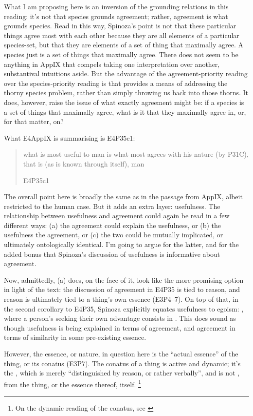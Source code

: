 \documentclass{article}
\newcommand\foreign[2]{\foreignlanguage{#1}{\emph{#2}}}
\begin{document}
What I am proposing here is an inversion of the grounding relations in this reading: it's not that species grounds agreement; rather, agreement is what grounds species. Read in this way, Spinoza's point is not that these particular things agree most with each other because they are all elements of a particular species-set, but that they are elements of a set of thing that maximally agree. A species just is a set of things that maximally agree. There does not seem to be anything in App\RN{9} that compels taking one interpretation over another, substantival intuitions aside. But the advantage of the agreement-priority reading over the species-priority reading is that provides a means of addressing the thorny species problem, rather than simply throwing us back into those thorns. It does, however, raise the issue of what exactly agreement might be: if a species is a set of things that maximally agree, what is it that they maximally agree in, or, for that matter, on?

What E4App\RN{9} is summarising is E4P35c1: \blockquote[E4P35c1]{what is most useful to man is what most agrees \textins{\foreign{latin}{convenit}} with his nature (by P31C), that is (as is known through itself), man}. The overall point here is broadly the same as in the passage from App\RN{9}, albeit restricted to the human case. But it adds an extra layer: usefulness. The relationship between usefulness and agreement could again be read in a few different ways: (a) the agreement could explain the usefulness, or (b) the usefulness the agreement, or (c) the two could be mutually implicated, or ultimately ontologically identical. I'm going to argue for the latter, and for the added bonus that Spinoza's discussion of usefulness is informative about agreement.

Now, admittedly, (a) does, on the face of it, look like the more promising option in light of the text: the discussion of agreement in E4P35 is tied to reason, and reason is ultimately tied to a thing's own essence (E3P4–7). On top of that, in the second corollary to E4P35, Spinoza explicitly equates usefulness to egoism: , where a person's seeking their own advantage consists in . This does sound as though usefulness is being explained in terms of agreement, and agreement in terms of similarity in some pre-existing essence.

However, the essence, or nature, in question here is the \enquote{actual essence} of the thing, or its conatus (E3P7). The conatus of a thing is active and dynamic; it's the , which is merely \enquote{distinguished by reason, or rather verbally}, and is not , from the thing, or the essence thereof, itself.
\footnote{On the dynamic reading of the conatus, see \cite[][Part 4, ch. 13]{RenzExplainability}}
\end{document}
